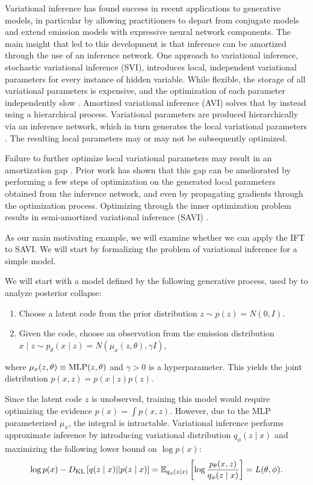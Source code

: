 \documentclass[11pt]{article}
\begin{document}
Variational inference has found success in recent applications to generative models,
in particular by allowing practitioners to depart from conjugate models
and extend emission models with expressive neural network components.
The main insight that led to this development is that inference can be amortized through
the use of an inference network.
One approach to variational inference, stochastic variational inference (SVI),
introduces local, independent variational parameters for every instance of hidden variable.
While flexible, the storage of all variational parameters is expensive, and the optimization
of each parameter independently slow \citep{}.
Amortized variational inference (AVI) solves that by instead using a hierarchical process.
Variational parameters are produced hierarchically via an inference network,
which in turn generates the local variational parameters \citep{}.
The resulting local parameters may or may not be subsequently optimized.

Failure to further optimize local variational parameters may result in an amortization gap \citep{}.
Prior work has shown that this gap can be ameliorated by performing a few steps of
optimization on the generated local parameters obtained from the inference network,
and even by propagating gradients through the optimization process.
Optimizing through the inner optimization problem results in semi-amortized variational inference
(SAVI) \citep{}.

As our main motivating example, we will examine whether we can apply the IFT to SAVI.
We will start by formalizing the problem of variational inference for a simple model.

We will start with a model defined by the following generative process,
used by \citet{dai2020vae} to analyze posterior collapse:
\begin{enumerate}
\item Choose a latent code from the prior distribution $z \sim p(z) = N(0, I)$.
\item Given the code, choose an observation from the emission distribution
    $x \mid z \sim p_\theta(x \mid z) = N(\mu_x(z, \theta), \gamma I)$,
\end{enumerate}
where $\mu_x(z, \theta) \equiv \mathrm{MLP}(z, \theta)$ and $\gamma > 0$ is a hyperparameter.
This yields the joint distribution $p(x,z) = p(x\mid z)p(z)$.

Since the latent code $z$ is unobserved, training this model would require optimizing the
evidence $p(x) = \int p(x,z)$.
However, due to the MLP parameterized $\mu_x$, the integral is intractable.
Variational inference performs approximate inference by introducing variational distribution
$q_\phi(z \mid x)$ and maximizing the following lower bound on $\log p(x)$:
\begin{equation}
    \log p(x) - D_\mathrm{KL}\left[q(z \mid x) || p(z \mid x)\right]
    = \mathbb{E}_{q_\phi(z \mid x)}\left[\log \frac{p_\theta(x,z)}{q_\phi(z\mid x)}\right] = L(\theta, \phi).
\end{equation}
\end{document}
